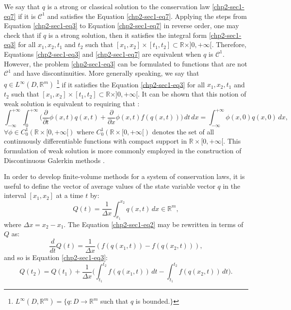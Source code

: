 We say that ${q}$ is a strong or classical solution to the conservation law \eqref{chp2-sec1-eq7}
if it is $\mathcal{C}^1$ and satisfies the Equation \eqref{chp2-sec1-eq7}.
Applying the steps from Equation \eqref{chp2-sec1-eq3} to Equation \eqref{chp2-sec1-eq7}
in reverse order, one may check that if ${q}$ is a strong solution,
then it satisfies the integral form \eqref{chp2-sec1-eq3} for all $x_1, x_2, t_1$ and $t_2$ such that
$[x_1, x_2] \times [t_1, t_2] \subset \mathbb{R}\times ]0, +\infty[$. 
Therefore, Equations \eqref{chp2-sec1-eq3} and \eqref{chp2-sec1-eq7} are
equivalent when ${q}$ is $\mathcal{C}^1$.
However, the problem \eqref{chp2-sec1-eq3} can be formulated
to functions that are not $\mathcal{C}^1$ and have discontinuities.
More generally speaking, we say that ${q} \in L^{\infty}(D, \mathbb{R}^m)$ 
\footnote{$L^{\infty}(D, \mathbb{R}^m) = \{q: D \to \mathbb{R}^m$
	such that $q$ is bounded.$\}$}
if it satisfies the Equation 
\eqref{chp2-sec1-eq3} for all $x_1, x_2, t_1$ and $t_2$ such that
$[x_1, x_2] \times [t_1, t_2] \subset \mathbb{R}\times ]0, +\infty[$.
It can be shown that this notion of weak solution is equivalent to requiring that \citep{leveque:1990}:
\begin{equation}
	\label{chp2-sec1-eq8}
	\int_{-\infty}^{+\infty} \int_{0}^{+\infty} \bigg(
	\frac{\partial}{\partial t} \phi(x, t){q}(x, t) +
	\frac{\partial}{\partial x} \phi(x ,t){f}({q}(x, t)) 
	\bigg)\,dt \,dx = 
	\int_{-\infty}^{+\infty} \phi(x, 0){q}(x, 0) \,dx  , \quad
\end{equation}
$\forall \phi \in C_{0}^{1}(\mathbb{R}\times[0, +\infty[)$
where $C_{0}^{1}(\mathbb{R}\times[0, +\infty[)$ denotes the set
of all continuously differentiable functions with compact support 
in $\mathbb{R}\times[0, +\infty[$. This formulation of weak solution
is more commonly employed in the construction of Discontinuous Galerkin
methods \citep{nair:2011}.

In order to develop finite-volume methods for a system of conservation laws, it is useful to define the vector of
average values of the state variable vector ${q}$ in the interval $[x_1, x_2]$ at a time $t$ by:
\begin{equation}
	\label{chp2-sec1-eq9}
	{Q}(t) = \frac{1}{\Delta x}
	\int_{x_1}^{x_2} {q}(x,t) \,dx
	\in \mathbb{R}^m,
\end{equation}
where $\Delta x = x_2 - x_1$. The Equation \eqref{chp2-sec1-eq2} may be  rewritten in terms of ${Q}$ as:
\begin{equation}
        \label{chp2-sec1-eq10}
	\frac{d}{dt} {Q}(t) = \frac{1}{\Delta x} 
	({f}({q}(x_1,t)) - {f}({q}(x_2,t))) ,
\end{equation}
and so is Equation \eqref{chp2-sec1-eq3}:
\begin{equation}
        \label{chp2-sec1-eq11}
	{Q}(t_2) =  {Q}(t_1) + 
	\frac{1}{\Delta x}\bigg( \int_{t_1}^{t_2} 
	{f}({q}(x_1, t)) \,dt - 
	\int_{t_1}^{t_2}{f}({q}(x_2, t)) \,dt \bigg).
\end{equation}

